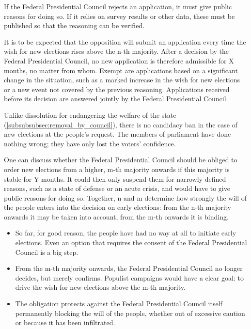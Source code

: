 If the Federal Presidential Council rejects an application, it must give public reasons for doing so.
If it relies on survey results or other data, these must be published so that the reasoning can be verified.

It is to be expected that the opposition will submit an application every time the wish for new elections rises above the n-th majority.
After a decision by the Federal Presidential Council, no new application is therefore admissible for X months, no matter from whom.
Exempt are applications based on a significant change in the situation, such as a marked increase in the wish for new elections or a new event not covered by the previous reasoning.
Applications received before its decision are answered jointly by the Federal Presidential Council.

Unlike dissolution for endangering the welfare of the state (\cref{subsubsubsec:removal_by_council}), there is no candidacy ban in the case of new elections at the people's request.
The members of parliament have done nothing wrong; they have only lost the voters' confidence.

One can discuss whether the Federal Presidential Council should be obliged to order new elections from a higher, m-th majority onwards if this majority is stable for Y months.
It could then only suspend them for narrowly defined reasons, such as a state of defense or an acute crisis, and would have to give public reasons for doing so.
Together, n and m determine how strongly the will of the people enters into the decision on early elections: from the n-th majority onwards it may be taken into account, from the m-th onwards it is binding.

\begin{itemize}
  \item So far, for good reason, the people have had no way at all to initiate early elections. Even an option that requires the consent of the Federal Presidential Council is a big step.
  \item From the m-th majority onwards, the Federal Presidential Council no longer decides, but merely confirms. Populist campaigns would have a clear goal: to drive the wish for new elections above the m-th majority.
\end{itemize}

\begin{itemize}
  \item The obligation protects against the Federal Presidential Council itself permanently blocking the will of the people, whether out of excessive caution or because it has been infiltrated.
\end{itemize}

